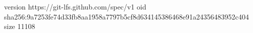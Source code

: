 version https://git-lfs.github.com/spec/v1
oid sha256:9a7253fe74d33fb8aa1958a7797b5cf8d634145386468e91a24356483952c404
size 11108
